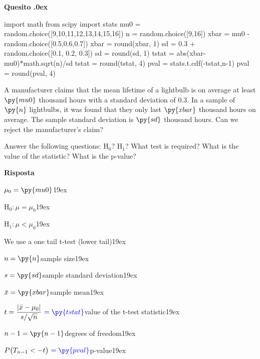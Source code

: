 \documentclass[11pt,twoside,a4paper]{article}
\newcounter{quesito}
\newenvironment{question}{\bigskip\addtocounter{quesito}{1}\bigskip\bigskip\par\textbf{Quesito \thequesito.\kern0ex}}{\par\vspace{\parskip}}
\newenvironment{answer}{\par\textbf{Risposta\quad}}{\par\vspace{\parskip}}
\begin{document}
\clearpage
\begin{question}
\begin{pycode}
import math
from scipy import stats
mu0 = random.choice([9,10,11,12,13,14,15,16])
n = random.choice([9,16])
xbar = mu0 - random.choice([0.5,0.6,0.7])
xbar = round(xbar, 1)
sd = 0.3 + random.choice([0.1, 0.2, 0.3])
sd = round(sd, 1)
tstat = abs(xbar-mu0)*math.sqrt(n)/sd
tstat = round(tstat, 4)
pval = stats.t.cdf(-tstat,n-1)
pval = round(pval, 4)
\end{pycode}
A manufacturer claims that the mean lifetime of a lightbulb is on average at least $\py{mu0}$ thousand  hours with a standard deviation of $0.3$. In a sample of $\py{n}$ lightbulbs, it was found that they only last $\py{xbar}$ thousand hours on average. The sample standard deviation is $\py{sd}$ thousand hours. Can we reject the manufacturer's claim? 

Answer the following questions: H$_0$? H$_1$? What test is required? What is the value of the statistic? What is the p-value? 

\begin{answer}\parskip5pt

  $\mu_0 = \py{mu0}$\kern19ex

  H$_0:$\hfill $\mu = \mu_0$\kern19ex
  
  H$_1:$\hfill $\mu<\mu_0$\kern19ex
  
  We use a one tail t-test (lower tail)\kern19ex
  
  $n = \py{n}$\hfill sample size\kern19ex
  
  $s = \py{sd}$\hfill sample standard deviation\kern19ex
  
  $\bar{x} = \py{xbar}$\hfill sample mean\kern19ex
  
  $t = \displaystyle\frac{|\bar{x}-\mu_0|}{s/\sqrt{n}}\  {\color{blue}= \py{tstat}}$\hfill value of the t-test statistic\kern19ex
  
  $n-1 = \py{n-1}$\hfill degrees of freedom\kern19ex
  
  $P\big(T_{n-1}<-t\big)\  {\color{blue}= \py{pval}}$\hfill p-value\kern19ex

\end{answer}
\end{question}
\end{document}
